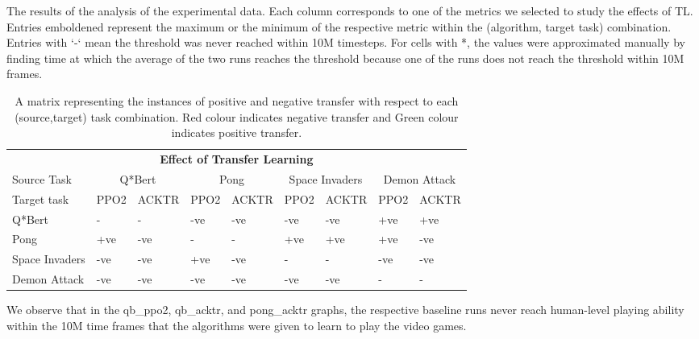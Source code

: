 \begin{table}[]
\endgroup
\caption{The results of the analysis of the experimental data. Each column corresponds to one of the metrics we selected to study the effects of TL. Entries emboldened represent the maximum or the minimum of the respective metric within the (algorithm, target task) combination. Entries with `-` mean the threshold was never reached within 10M timesteps. For cells with *, the values were approximated manually by finding time at which the average of the two runs reaches the threshold because one of the runs does not reach the threshold within 10M frames.}
\end{table}

\begin{table}[]
	\begingroup
	\begin{tabular}{p{3cm}p{1cm}p{1cm}p{1cm}p{1cm}p{1cm}p{1cm}p{1cm}p{1cm}}
		\hline
		\multicolumn{9}{c}{\textbf{Effect of Transfer Learning}} \\	
		\rowcolor[HTML]{EFEFEF} Source Task & \multicolumn{2}{c}{Q*Bert} & \multicolumn{2}{c}{Pong} & \multicolumn{2}{c}{Space Invaders} & \multicolumn{2}{c}{Demon Attack} \\
		
		Target task & \cellcolor[HTML]{ECF4FF}PPO2 & \cellcolor[HTML]{ECF4FF}ACKTR & \cellcolor[HTML]{ECF4FF}PPO2 & \cellcolor[HTML]{ECF4FF}ACKTR & \cellcolor[HTML]{ECF4FF}PPO2 & \cellcolor[HTML]{ECF4FF}ACKTR & \cellcolor[HTML]{ECF4FF}PPO2 & \cellcolor[HTML]{ECF4FF}ACKTR \\
		Q*Bert & - & - & \cellcolor[HTML]{FFCE93}-ve & \cellcolor[HTML]{FFCE93}-ve & \cellcolor[HTML]{FFCE93}-ve & \cellcolor[HTML]{FFCE93}-ve & \cellcolor[HTML]{9AFF99}+ve & \cellcolor[HTML]{9AFF99}+ve \\
		Pong & \cellcolor[HTML]{9AFF99}+ve & \cellcolor[HTML]{FFCE93}-ve & - & - & \cellcolor[HTML]{9AFF99}+ve & \cellcolor[HTML]{9AFF99}+ve & \cellcolor[HTML]{9AFF99}+ve & \cellcolor[HTML]{FFCE93}-ve \\
		Space Invaders & \cellcolor[HTML]{FFCE93}-ve & \cellcolor[HTML]{FFCE93}-ve & \cellcolor[HTML]{9AFF99}+ve & \cellcolor[HTML]{FFCE93}-ve & - & - & \cellcolor[HTML]{FFCE93}-ve & \cellcolor[HTML]{FFCE93}-ve \\
		Demon Attack & \cellcolor[HTML]{FFCE93}-ve & \cellcolor[HTML]{FFCE93}-ve & \cellcolor[HTML]{FFCE93}-ve & \cellcolor[HTML]{FFCE93}-ve & \cellcolor[HTML]{FFCE93}-ve & \cellcolor[HTML]{FFCE93}-ve & - & - \\
		\hline
	\end{tabular}
\endgroup
\caption{ A matrix representing the instances of positive and negative transfer with respect to each (source,target) task combination. Red colour indicates negative transfer and Green colour indicates positive transfer.}
\end{table}
We observe that in the qb\_ppo2, qb\_acktr, and pong\_acktr graphs, the respective baseline runs never reach human-level playing ability within the 10M time frames that the algorithms were given to learn to play the video games.
 

